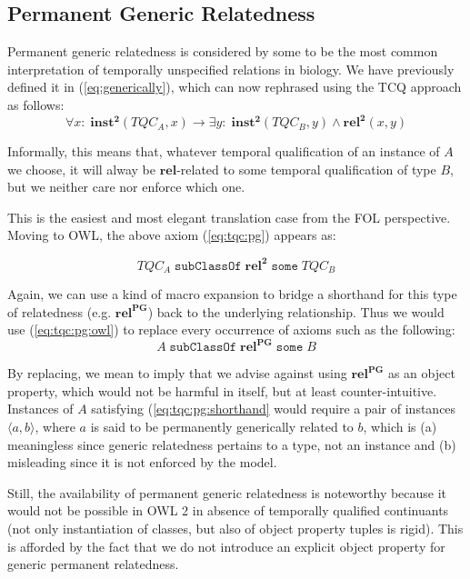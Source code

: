 \documentclass[10pt]{bmc_article}
\newcommand{\mirel}[1]{\ensuremath{\mathrm{\mathbf{#1}}}}
\newcommand{\mclass}[1]{\ensuremath{\mathit{#1}}}
\newcommand{\mrel}[2]{\mirel{#1^#2}}
\newcommand{\mrelb}[1]{\mrel{#1}{2}}
\newcommand{\pair}[2]{\ensuremath{\langle #1,#2\rangle}}
\newcommand{\TQC}[1]{\ensuremath{TQC_{\mclass{#1}}}}
\newcommand{\mrelpg}[1]{\mrel{#1}{{PG}}}
\newenvironment{bmcformat}{\baselineskip20pt\sloppy\setboolean{publ}{false}}{\baselineskip20pt\sloppy}
\begin{document}
\begin{bmcformat}
\subsection*{Permanent Generic Relatedness}
Permanent generic relatedness is considered by some to be the most common
interpretation of temporally unspecified relations in biology. We have
previously defined it in (\ref{eq:generically}), which can
now rephrased using the TCQ approach as follows:
\begin{equation}
\forall x:\; \mrelb{inst}(\TQC{A},x) \rightarrow \exists y :\;
\mrelb{inst}(\TQC{B}, y) \wedge \mrelb{rel}(x,y)
\label{eq:tqc:pg}
\end{equation}

Informally, this means that, whatever temporal qualification of an instance of
\mclass{A} we choose, it will alway be \mirel{rel}-related to some temporal
qualification of type \mclass{B}, but we neither care nor enforce which one.

This is the easiest and most elegant translation case from the FOL perspective.
Moving to OWL, the above axiom (\ref{eq:tqc:pg}) appears as: 

\begin{equation}
\TQC{A}\;\mathtt{subClassOf}\;\mrelb{rel}\;\mathtt{some}\;\TQC{B}
\label{eq:tqc:pg:owl}
\end{equation}

Again, we can use a kind of macro expansion to bridge a shorthand for this type
of relatedness (e.g. \mrelpg{rel}) back to the
underlying relationship. Thus we would use (\ref{eq:tqc:pg:owl}) to replace
every occurrence of axioms such as the following:
\begin{equation}
\mclass{A}\;\mathtt{subClassOf}\;\mrelpg{rel}\;\mathtt{some}\;\mclass{B}  
\label{eq:tqc:pg:shorthand}
\end{equation}

By replacing, we mean to imply that we advise against using \mrelpg{rel} as an
object property, which would not be harmful in itself, but at least
counter-intuitive. Instances of \mclass{A} satisfying
(\ref{eq:tqc:pg:shorthand} would require a pair of instances \pair{a}{b}, where
$a$ is said to be permanently generically related to $b$, which is (a)
meaningless since generic relatedness pertains to a type, not an instance and
(b) misleading since it is not enforced by the model.

Still, the availability of permanent generic relatedness is noteworthy because
it would not be possible in OWL 2 in absence of temporally qualified
continuants (not only instantiation of classes, but also of object property
tuples is rigid). This is afforded by the fact that we do not introduce an
explicit object property for generic permanent relatedness. 


\end{bmcformat}
\end{document}
